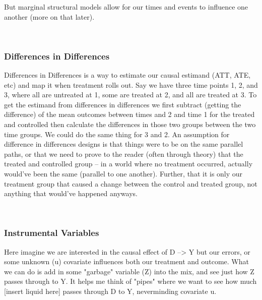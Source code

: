 \documentclass[12pt]{article}\usepackage[]{graphicx}\usepackage[]{color}
\begin{document}
\begin{flushleft}
\noindent But marginal structural models allow for our times and events to influence one another (more on that later).


\hfill \\

\subsubsection{Differences in Differences}
Differences in Differences is a way to estimate our causal estimand (ATT, ATE, etc) and map it when treatment rolls out. Say we have three time points 1, 2, and 3, where all are untreated at 1, some are treated at 2, and all are treated at 3. To get the estimand from differences in differences we first subtract (getting the difference) of the mean outcomes between times and 2 and time 1 for the treated and controlled then calculate the differences in those two groups between the two time groups. We could do the same thing for 3 and 2. An assumption for difference in differences designs is that things were to be on the same parallel paths, or that we need to prove to the reader (often through theory) that the treated and controlled group -- in a world where no treatment occurred, actually would've been the same (parallel to one another). Further, that it is only our treatment group that caused a change between the control and treated group, not anything that would've happened anyways.

\hfill \\

\subsubsection{Instrumental Variables}

Here imagine we are interested in the causal effect of D --> Y but our errors, or some unknown (u) covariate influences both our treatment and outcome. What we can do is add in some "garbage" variable (Z) into the mix, and see just how Z passes through to Y. It helps me think of "pipes" where we want to see how much [insert liquid here] passes through D to Y, neverminding covariate u.

\begin{center}
\end{center}
\hfill


\end{flushleft}
\end{document}
